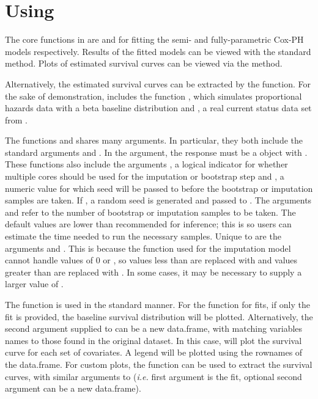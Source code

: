 \documentclass[article]{jss}
\begin{document}
{\section[use]{Using }	
	
	The core functions in  are  and  for fitting the semi- and fully-parametric Cox-PH models respectively. Results of the fitted models can be viewed with the standard  method. Plots of estimated survival curves can be viewed via the  method. 
	
	Alternatively, the estimated survival curves can be extracted by the  function. For the sake of demonstration,  includes the function , which simulates proportional hazards data with a beta baseline distribution and , a real current status data set from \cite{mice_tumors}.
	
	The functions  and  shares many arguments. In particular, they both include the standard arguments  and . In the  argument, the response must be a  object with . These functions also include the arguments , a logical indicator for whether multiple cores should be used for the imputation or bootstrap step and , a numeric value for which seed will be passed to  before the bootstrap or imputation samples are taken. If , a random seed is generated and passed to . The arguments  and  refer to the number of bootstrap or imputation samples to be taken. The default values are lower than recommended for inference; this is so users can estimate the time needed to run the necessary samples. Unique to  are the arguments  and . This is because the  function  used for the imputation model cannot handle values of 0 or , so values less than  are replaced with  and values greater than  are replaced with . In some cases, it may be necessary to supply a larger value of . 
	
	The  function is used in the standard manner. For the  function for  fits, if only the fit is provided, the baseline survival distribution will be plotted. Alternatively, the second argument supplied to  can be a new data.frame, with matching variables names to those found in the original dataset. In this case,  will plot the survival curve for each set of covariates. A legend will be plotted using the rownames of the data.frame. For custom plots, the function  can be used to extract the survival curves, with similar arguments to  (\emph{i.e.} first argument is the fit, optional second argument can be a new data.frame). 
	
}
\end{document}
